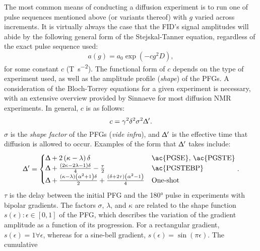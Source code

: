 The most common means of conducting a diffusion experiment is to run one of
pulse sequences mentioned above (or variants thereof) with $g$ varied across
increments.
It is virtually always the case that the \ac{FID}'s signal amplitudes will
abide by the following general form of the Stejskal-Tanner equation,
regardless of the exact pulse sequence used:
\begin{equation}
    a(g) = a_0 \exp\left(- c g^2 D\right),
\end{equation}
for some constant $c$ (\unit{\tesla\per\second\squared}).
The functional form of $c$ depends on the type of experiment used, as well as
the amplitude profile (\emph{shape}) of the \acp{PFG}.
A consideration of the Bloch-Torrey equations for a given experiment is
necessary, with an extensive overview provided by Sinnaeve for most diffusion
NMR experiments\cite{Sinnaeve2012}. In general, $c$ is as follows:
\begin{equation}
    c = \gamma^2 \delta^2 \sigma^2 \Updelta^{\prime}.
    \label{eq:stejskal_tanner_generic}
\end{equation}
$\sigma$ is the \emph{shape factor} of the \acp{PFG} (\textit{vide infra}),
and $\Updelta^{\prime}$ is the effective time that diffusion is allowed
to occur. Examples of the form that $\Updelta^{\prime}$ takes include:
\begin{equation}
    \Updelta^{\prime} =
    \begin{cases}
        \Updelta + 2 \left(\kappa - \lambda\right) \delta &
        \text{\ac{PGSE}, \ac{PGSTE}}\\
        \Updelta + \frac{\left(2 \kappa - 2 \lambda - 1\right)\delta}{4} - \frac{\tau}{2} &
        \text{\ac{PGSTEBP}} \\
        \Updelta + \frac{\left(\kappa - \lambda\right)
            \left(\alpha^2 + 1\right) \delta}{2} +
        \frac{\left(\delta + 2 \tau\right)\left(\alpha^2 - 1\right)}{4} &
        \text{One-shot}
    \end{cases}.
    \label{eq:Delta-prime}
\end{equation}
$\tau$ is the delay between the initial \ac{PFG} and the \ang{180} pulse in
experiments with bipolar gradients.
The factors $\sigma$,  $\lambda$, and $\kappa$ are related to the shape
function $s(\epsilon) : \epsilon \in [0, 1]$ of the \ac{PFG}, which describes
the variation of the gradient amplitude as a function of its progression.
For a rectangular gradient, $s(\epsilon) = 1 \forall \epsilon$, whereas for a
sine-bell gradient, $s(\epsilon) = \sin(\pi \epsilon)$. The cumulative
